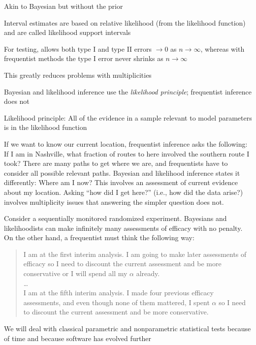  \item Akin to Bayesian but without the prior
  \item Interval estimates are based on relative likelihood (from the
    likelihood function) and are called likelihood support intervals
  \item For testing, allows both type I and type II errors
    $\rightarrow 0$ as $n \rightarrow \infty$, whereas with
    frequentist methods the type I error never shrinks as $n
    \rightarrow \infty$
  \item This greatly reduces problems with multiplicities
  \ei
\item Bayesian and likelihood inference use the \emph{likelihood
    principle}; frequentist inference does not 
 \bi
 \item Likelihood principle: All of the evidence in a sample relevant
   to model parameters is in the likelihood function 
 \item If we want to know our current location, frequentist inference
   asks the following: If I am in Nashville, what fraction of routes
   to here involved the southern route I took? 
   There are many paths to get where we are, and frequentists have to
   consider all possible relevant paths.  Bayesian and likelihood
   inference states it differently: Where am I now?  This involves an
   assessment of current evidence about my location.  Asking ``how did
   I get here?'' (i.e., how did the data arise?) involves multiplicity
   issues that answering the simpler question does not. 
\item Consider a sequentially monitored randomized experiment.
  Bayesians and likelihoodists can make infinitely many assessments of
  efficacy with no penalty.  On the other hand, a frequentist must
  think the following way:
  \begin{quote}
    I am at the first interim analysis.  I am going to make later
    assessments of efficacy so I need to discount the current
    assessment and be more conservative or I will spend all my
    $\alpha$ already.\\
    \ldots\\
    I am at the fifth interim analysis.  I made four previous efficacy
    assessments, and even though none of them mattered, I spent
    $\alpha$ so I need to discount the current assessment and be more
    conservative.
 \end{quote}
 \ei
\item We will deal with classical parametric and nonparametric
  statistical tests because of time and because software has evolved further
\ei


